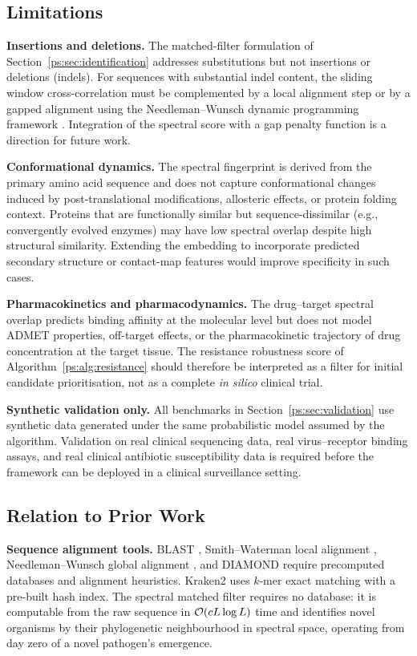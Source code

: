\subsection{Limitations}

\noindent\textbf{Insertions and deletions.} The matched-filter formulation of
Section~\ref{ps:sec:identification} addresses substitutions but not insertions or
deletions (indels). For sequences with substantial indel content, the sliding
window cross-correlation must be complemented by a local alignment step
\citep{smith1981} or by a gapped alignment using the Needleman--Wunsch dynamic
programming framework \citep{needleman1970}. Integration of the spectral score
with a gap penalty function is a direction for future work.

\noindent\textbf{Conformational dynamics.} The spectral fingerprint is derived
from the primary amino acid sequence and does not capture conformational changes
induced by post-translational modifications, allosteric effects, or protein
folding context. Proteins that are functionally similar but sequence-dissimilar
(e.g., convergently evolved enzymes) may have low spectral overlap despite high
structural similarity. Extending the embedding to incorporate predicted secondary
structure or contact-map features would improve specificity in such cases.

\noindent\textbf{Pharmacokinetics and pharmacodynamics.} The drug--target
spectral overlap predicts binding affinity at the molecular level but does not
model ADMET properties, off-target effects, or the pharmacokinetic trajectory of
drug concentration at the target tissue. The resistance robustness score of
Algorithm~\ref{ps:alg:resistance} should therefore be interpreted as a filter for
initial candidate prioritisation, not as a complete \textit{in silico} clinical
trial.

\noindent\textbf{Synthetic validation only.} All benchmarks in
Section~\ref{ps:sec:validation} use synthetic data generated under the same
probabilistic model assumed by the algorithm. Validation on real clinical
sequencing data, real virus--receptor binding assays, and real clinical
antibiotic susceptibility data is required before the framework can be deployed
in a clinical surveillance setting.

\subsection{Relation to Prior Work}

\noindent\textbf{Sequence alignment tools.} BLAST \citep{altschul1990,
altschul1997}, Smith--Waterman local alignment \citep{smith1981},
Needleman--Wunsch global alignment \citep{needleman1970}, and DIAMOND
\citep{buchfink2015} require precomputed databases and alignment heuristics.
Kraken2 \citep{wood2019} uses $k$-mer exact matching with a pre-built hash
index. The spectral matched filter requires no database: it is computable from
the raw sequence in $\mathcal{O}(cL\log L)$ time and identifies novel organisms by
their phylogenetic neighbourhood in spectral space, operating from day zero of
a novel pathogen's emergence.

